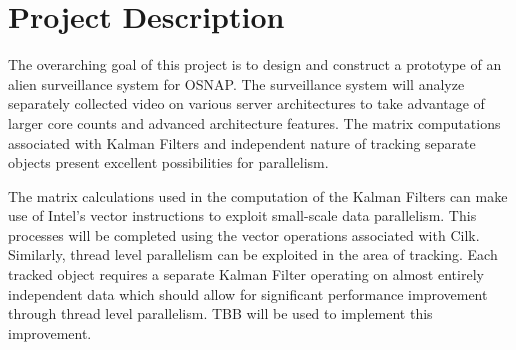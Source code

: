 \chapter*{Project Description}
The overarching goal of this project is to design and construct a prototype of an alien surveillance system for OSNAP.  The surveillance system will analyze separately collected video on various server architectures to take advantage of larger core counts and advanced architecture features. The matrix computations associated with Kalman Filters and independent nature of tracking separate objects present excellent possibilities for parallelism.

 The matrix calculations used in the computation of the Kalman Filters can make use of Intel's vector instructions to exploit small-scale data parallelism. This processes will be completed using the vector operations associated with Cilk. Similarly, thread level parallelism can be exploited in the area of tracking. Each tracked object requires a separate Kalman Filter operating on almost entirely independent data which should allow for significant performance improvement through thread level parallelism. TBB will be used to implement this improvement.

